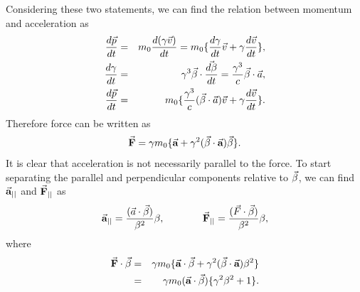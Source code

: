 \documentclass[a4paper,oneside,12pt]{report}
\numberwithin{equation}{chapter}
\begin{document}
Considering these two statements, we can find the relation between momentum and acceleration as 
\vspace{-10pt}
\begin{eqnarray}
    \deriv{\vecthree{p}}{t} &=& m_0 \deriv{(\gamma \vecthree{v})}{t} = m_0 \{  \deriv{\gamma}{t}\vecthree{v} + \gamma \deriv{\vecthree{v}}{t}   \} ,\\
    \deriv{\gamma}{t} &=& \gamma^3 \dotProd{\beta}{\deriv{\beta}{t}} = \frac{\gamma^3}{c} \dotProd{\beta}{a}   , \\
    \deriv{\vecthree{p}}{t}  &=& m_0 \{   \frac{\gamma^3}{c} (\dotProd{\beta}{a} )\vecthree{v} + \gamma \deriv{\vecthree{v}}{t}  \} .
    \vspace{-10pt}
\end{eqnarray}
Therefore force can be written as
\vspace{-10pt}
\begin{equation} \label{eq:Frel}
    \vecthreeBF{F}  = \gamma m_0 \{ \vecthreeBF{a} + \gamma^2(\dotProd{\beta}{\textbf{a}})\vecthree{\beta} \} .
    \vspace{-10pt}
\end{equation}
\clearpage
It is clear that acceleration is not necessarily parallel to the force. 
To start separating the parallel and perpendicular components relative to $\vec{\beta}$, we can find $\vec{\textbf{a}}_{||}$ and $\vec{\textbf{F}}_{||}$ as
\vspace{-10pt}
\begin{equation} \label{eq:a_F_parallels}
    \begin{aligned}
        \vecthreeBF{a}_{||} = \frac{(\dotProd{a}{\beta})}{\beta^2}\beta  ,
    \end{aligned}
    \qquad \qquad
    \begin{aligned}
        \vecthreeBF{F}_{||} = \frac{(\dotProd{F}{\beta})}{\beta^2}\beta  ,
    \end{aligned}
    \vspace{-10pt}
\end{equation}
where 
\vspace{-10pt}
\begin{eqnarray}
    \dotProd{\textbf{F}}{\beta} &=& \gamma m_0 \{ \dotProd{\textbf{a}}{\beta} + \gamma^2(\dotProd{\beta}{\textbf{a}})\beta^2 \} \nonumber\\
                                &=& \gamma m_0 (\dotProd{\textbf{a}}{\beta}) \{ \gamma^2\beta^2  + 1\} .
                                \vspace{-10pt}
\end{eqnarray}
\end{document}

